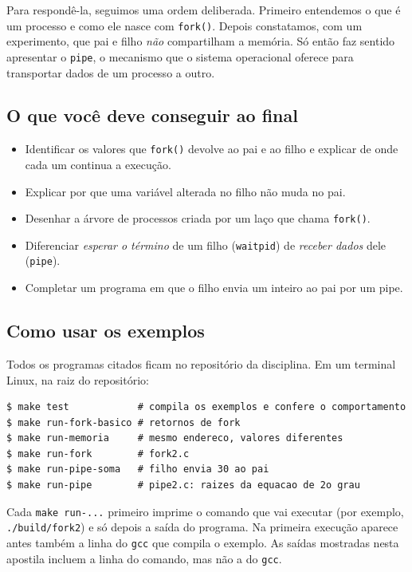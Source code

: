 \documentclass[11pt,a4paper]{article}
\newcommand{\cmd}[1]{\texttt{#1}}
\begin{document}
Para respondê-la, seguimos uma ordem deliberada. Primeiro entendemos o que é um processo e como ele nasce com \cmd{fork()}. Depois constatamos, com um experimento, que pai e filho \emph{não} compartilham a memória. Só então faz sentido apresentar o \cmd{pipe}, o mecanismo que o sistema operacional oferece para transportar dados de um processo a outro.

\subsection{O que você deve conseguir ao final}

\begin{itemize}
    \item Identificar os valores que \cmd{fork()} devolve ao pai e ao filho e explicar de onde cada um continua a execução.
    \item Explicar por que uma variável alterada no filho não muda no pai.
    \item Desenhar a árvore de processos criada por um laço que chama \cmd{fork()}.
    \item Diferenciar \emph{esperar o término} de um filho (\cmd{waitpid}) de \emph{receber dados} dele (\cmd{pipe}).
    \item Completar um programa em que o filho envia um inteiro ao pai por um pipe.
\end{itemize}

\subsection{Como usar os exemplos}

Todos os programas citados ficam no repositório da disciplina. Em um terminal Linux, na raiz do repositório:

\begin{lstlisting}[style=terminal]
$ make test            # compila os exemplos e confere o comportamento
$ make run-fork-basico # retornos de fork
$ make run-memoria     # mesmo endereco, valores diferentes
$ make run-fork        # fork2.c
$ make run-pipe-soma   # filho envia 30 ao pai
$ make run-pipe        # pipe2.c: raizes da equacao de 2o grau
\end{lstlisting}

Cada \cmd{make run-...} primeiro imprime o comando que vai executar (por exemplo, \cmd{./build/fork2}) e só depois a saída do programa. Na primeira execução aparece antes também a linha do \cmd{gcc} que compila o exemplo. As saídas mostradas nesta apostila incluem a linha do comando, mas não a do \cmd{gcc}.
\end{document}
